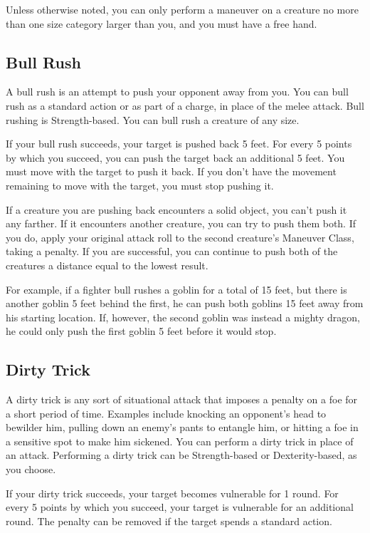 Unless otherwise noted, you can only perform a maneuver on a creature no more than one size category larger than you, and you must have a free hand.

\subsection{Bull Rush}
A bull rush is an attempt to push your opponent away from you. You can bull rush as a standard action or as part of a charge, in place of the melee attack. Bull rushing is Strength-based. You can bull rush a creature of any size.

If your bull rush succeeds, your target is pushed back 5 feet. For every 5 points by which you succeed, you can push the target back an additional 5 feet. You must move with the target to push it back. If you don't have the movement remaining to move with the target, you must stop pushing it.

If a creature you are pushing back encounters a solid object, you can't push it any farther. If it encounters another creature, you can try to push them both. If you do, apply your original attack roll to the second creature's Maneuver Class, taking a  penalty. If you are successful, you can continue to push both of the creatures a distance equal to the lowest result.

For example, if a fighter bull rushes a goblin for a total of 15 feet, but there is another goblin 5 feet behind the first, he can push both goblins 15 feet away from his starting location. If, however, the second goblin was instead a mighty dragon, he could only push the first goblin 5 feet before it would stop.

\subsection{Dirty Trick}
A dirty trick is any sort of situational attack that imposes a penalty on a foe for a short period of time. Examples include knocking an opponent's head to bewilder him, pulling down an enemy's pants to entangle him, or hitting a foe in a sensitive spot to make him sickened. You can perform a dirty trick in place of an attack. Performing a dirty trick can be Strength-based or Dexterity-based, as you choose.

If your dirty trick succeeds, your target becomes vulnerable for 1 round. \vulnerableexplanation For every 5 points by which you succeed, your target is vulnerable for an additional round. The penalty can be removed if the target spends a standard action.

